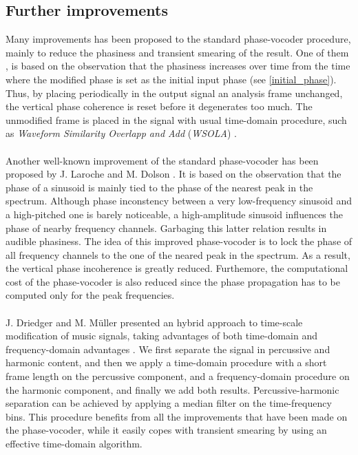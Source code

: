 \documentclass[letterpaper]{article}
\theoremstyle{definition}
\theoremstyle{remark}
\begin{document}
\subsection{Further improvements}
Many improvements has been proposed to the standard phase-vocoder procedure,
mainly to reduce the phasiness and transient smearing of the result. One of
them \citep{Dorran_audiotime_scale, Kraft2012ImprovedPT}, is based on the
observation that the phasiness increases over time from the time where the
modified phase is set as the initial input phase (see \eqref{initial_phase}).
Thus, by placing periodically in the output signal an analysis frame unchanged,
the vertical phase coherence is reset before it degenerates too much. The
unmodified frame is placed in the signal with usual time-domain procedure,
such as \emph{Waveform Similarity Overlapp and Add} (\emph{WSOLA})
\citep{Verhelst1993}.

\paragraph{}
Another well-known improvement of the standard phase-vocoder has been proposed
by J. Laroche and M. Dolson \citep{Laroche1999}. It is based on the observation
that the phase of a sinusoid is mainly tied to the phase of the nearest peak
in the spectrum. Although phase inconstency between a very low-frequency
sinusoid and a high-pitched one is barely noticeable, a high-amplitude sinusoid
influences the phase of nearby frequency channels. Garbaging this latter
relation results in audible phasiness. The idea of this improved phase-vocoder
is to lock the phase of all frequency channels to the one of the neared peak
in the spectrum. As a result, the vertical phase incoherence is greatly reduced.
Furthemore, the computational cost of the phase-vocoder is also reduced since
the phase propagation has to be computed only for the peak frequencies.

\paragraph{}
J. Driedger and M. Müller presented an hybrid approach to time-scale
modification of music signals, taking advantages of both time-domain and
frequency-domain advantages \citep{DM}. We first separate the signal in
percussive and harmonic content, and then we apply a time-domain procedure with
a short frame length on the percussive component, and a frequency-domain
procedure on the harmonic component, and finally we add both results.
Percussive-harmonic separation can be achieved by applying a median filter
on the time-frequency bins. This procedure benefits from all the improvements
that have been made on the phase-vocoder, while it easily copes with transient
smearing by using an effective time-domain algorithm.
\end{document}
